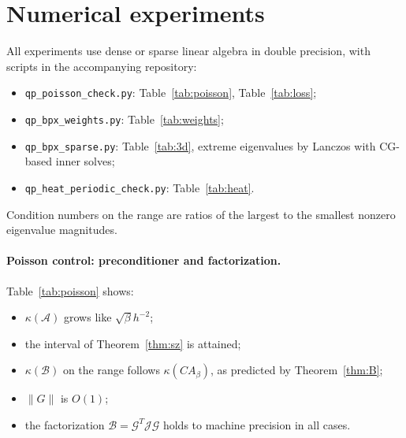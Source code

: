 \documentclass[11pt,a4paper]{article}
\newcommand{\A}{\mathcal{A}}
\newcommand{\B}{\mathcal{B}}
\newcommand{\G}{\mathcal{G}}
\newcommand{\J}{\mathcal{J}}
\theoremstyle{remark}
\begin{document}
\section{Numerical experiments}\label{sec:num}

All experiments use dense or sparse linear algebra in double precision,
with scripts in the accompanying repository:
\begin{itemize}
\item \texttt{qp\_poisson\_check.py}: Table~\ref{tab:poisson}, Table~\ref{tab:loss};
\item \texttt{qp\_bpx\_weights.py}: Table~\ref{tab:weights};
\item \texttt{qp\_bpx\_sparse.py}: Table~\ref{tab:3d}, extreme eigenvalues by
  Lanczos with CG-based inner solves;
\item \texttt{qp\_heat\_periodic\_check.py}: Table~\ref{tab:heat}.
\end{itemize}
Condition numbers on the range are ratios of the largest to the smallest
nonzero eigenvalue magnitudes.

\paragraph{Poisson control: preconditioner and factorization.}
Table~\ref{tab:poisson} shows:
\begin{itemize}
\item $\kappa(\A)$ grows like $\sqrt\beta h^{-2}$;
\item the interval of Theorem~\ref{thm:sz} is attained;
\item $\kappa(\B)$ on the range follows $\kappa(CA_\beta)$, as predicted by
  Theorem~\ref{thm:B};
\item $\|G\|$ is $O(1)$;
\item the factorization $\B=\G^T\J\G$ holds to machine precision in all
  cases.
\end{itemize}
\end{document}

